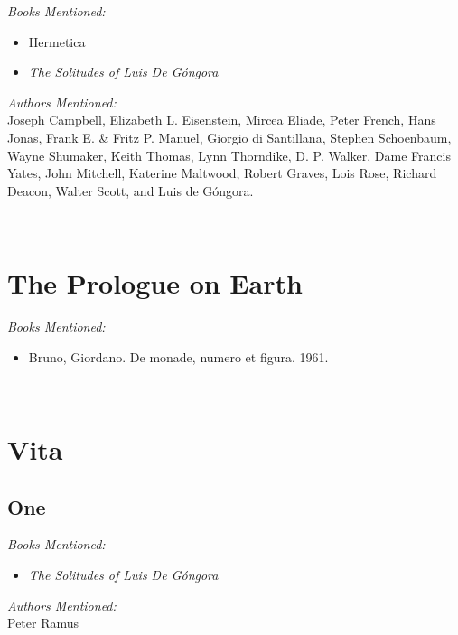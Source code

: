\documentclass[twoside,10pt]{report}
\newcommand\fleuron{\begin{turn}{45}\Large \ding{166}\end{turn}}
\newcommand\doublefleuron{%
	\reflectbox{\fleuron}\AC\staveXLIX\reflectbox{\AC}\fleuron}
\newcommand\fleuronbar{%
	{\huge\LinearACCCXIII}\xrfill[1.3ex]{1pt}\doublefleuron\xrfill[1.3ex]{1pt}\reflectbox{\huge\LinearACCCXIII}}
\newcommand\nbvspace[1][3]{\vspace*{\stretch{#1}}}
\begin{document}
\textit{Books Mentioned:}
\begin{itemize}
\item Hermetica\cite{Scott1924}
\item \textit{The Solitudes of Luis De Góngora} \cite{DeGongoraYArgote1968}
\end{itemize}

\textit{Authors Mentioned:}\\
Joseph Campbell, Elizabeth L. Eisenstein, Mircea Eliade, Peter French, Hans Jonas, Frank
E. \& Fritz P. Manuel, Giorgio di Santillana, Stephen Schoenbaum, Wayne Shumaker, Keith
Thomas, Lynn Thorndike, D. P. Walker, Dame Francis Yates, John Mitchell, Katerine
Maltwood, Robert Graves, Lois Rose, Richard Deacon, Walter Scott, and Luis de Góngora.
\begin{center}
\vfill
\shadowoffset{1pt}
\shadowtext{%
{\color{Mahogany}\fontsize{60}{64}\staveL}}\\
\nbvspace[1]
\end{center}


\chapter{The Prologue on Earth}
\pagestyle{fancy}
\textit{Books Mentioned:}
\begin{itemize}
\item Bruno, Giordano. De monade, numero et figura. 1961.\cite{Bruno1961}
\end{itemize}
\begin{center}
\vfill
\shadowoffset{1pt}
\shadowtext{%
{\color{Mahogany}\fontsize{60}{64}\staveLIX}}\\
\nbvspace[1]
\end{center}


\chapter{Vita}
\section{One}
\textit{Books Mentioned:}
\begin{itemize}
\item \textit{The Solitudes of Luis De Góngora} \cite{DeGongoraYArgote1968}
\end{itemize}
\textit{Authors Mentioned:}\\
Peter Ramus
\end{document}
